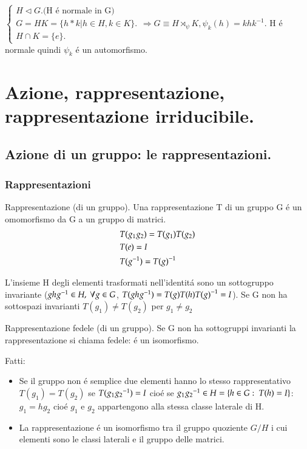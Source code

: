 \documentclass[oneside,12pt]{memoir}
\begin{document}
$\left\{
\begin{array}{l}
 H\triangleleft G. \textrm{(H \'e normale in G)} \\
 G=HK=\{h*k | h\in H, k \in K\}. \\
 H\cap K=\{e\}.
\end{array}
\right. \Rightarrow G\equiv H\rtimes_{\psi}K, \psi_k(h)=khk^{-1}$.
H \'e normale quindi $\psi_k$ \'e un automorfismo.

\chapter{Azione, rappresentazione, rappresentazione irriducibile.}
\PartialToc

\section{Azione di un gruppo: le rappresentazioni.}


\subsection{Rappresentazioni}

\begin{definition}{Rappresentazione (di un gruppo).}
Una rappresentazione T di un gruppo G \'e un omomorfismo da G a un gruppo di matrici.
\begin{align*}
&T(g_1g_2)=T(g_1)T(g_2)\\
&T(e)=I\\
&T({{g}^{-1}})={{T(g)}^{-1}}
\end{align*}
\end{definition}

L'insieme H degli elementi trasformati nell'identit\'a sono un sottogruppo invariante ($gh\invers{g}\in H,\ \forall g\in G$, $T(gh{{g}^{-1}})=T(g)T(h){{T(g)}^{-1}}=I$). Se G non ha sottospazi  invarianti $T(g_1)\neq T(g_2)$ per $g_1\neq g_2$

\begin{definition}{Rappresentazione fedele (di un gruppo).}
Se G non ha sottogruppi invarianti la rappresentazione si chiama fedele: \'e un isomorfismo.
\end{definition}

Fatti:
\begin{itemize}
\item Se il gruppo non \'e semplice due elementi hanno lo stesso rappresentativo $T(g_1)=T(g_2)$ se $T(g_1{{g_2}^{-1}})=I$ cio\'e se $g_1{{g_2}^{-1}}\in H=\{h\in G:\ T(h)=I\}$: $g_1=hg_2$ cio\'e $g_1$ e $g_2$ appartengono alla stessa classe laterale di H.
\item La rappresentazione \'e un isomorfismo tra il gruppo quoziente $G/H$ i cui elementi sono le classi laterali e il gruppo delle matrici.
\end{itemize}
\end{document}
